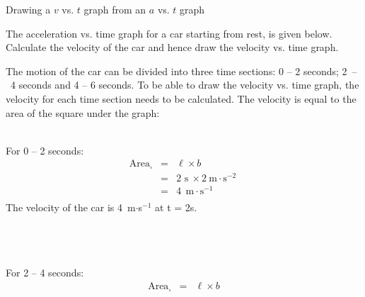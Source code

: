 \begin{wex}{Drawing a $v$ vs. $t$ graph from an $a$ vs. $t$ graph}
{The acceleration vs. time graph for a car starting from rest, is given below. Calculate the velocity of the car and hence draw the velocity vs. time graph.
\begin{center}
\end{center}}
{
The motion of the car can be divided into three time sections: 0 -- 2 seconds; 2~--~4 seconds and 4 -- 6 seconds. To be able to draw the velocity vs. time graph, the velocity for each time section needs to be calculated. The velocity is equal to the area of the square under the graph:\\
\\
\hspace*{-45pt}
\begin{minipage}{0.3\textwidth}
For 0 -- 2 seconds:
\begin{eqnarray*}
\text{Area}_{\square} &=& \ell \times b\\
&=& 2\text{~s}\ \times 2~\text{m}\cdot \text{s}^{-2}\ \\
&=&4\ ~\text{m}\cdot \text{s}^{-1}\\
\end{eqnarray*}
The velocity of the car is 4~m$\cdot$s$^{-1}$ at t = 2s.\\
\\
\\
\\
\end{minipage}
\begin{minipage}{0.03\textwidth}
\begin{center}
\end{center}
\end{minipage}
\begin{minipage}{0.3\textwidth}
For 2 -- 4 seconds:
\begin{eqnarray*}
\text{Area}_{\square} &=& \ell \times b\\

\end{eqnarray*}
\end{minipage}}
\end{wex}
